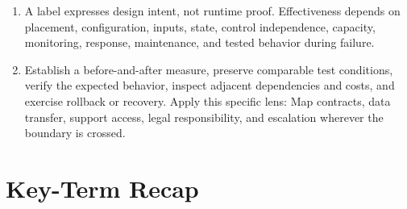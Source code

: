 \documentclass[11pt]{article}
\begin{document}
\begin{enumerate}
\item A label expresses design intent, not runtime proof. Effectiveness depends on placement, configuration, inputs, state, control independence, capacity, monitoring, response, maintenance, and tested behavior during failure.
\item Establish a before-and-after measure, preserve comparable test conditions, verify the expected behavior, inspect adjacent dependencies and costs, and exercise rollback or recovery. Apply this specific lens: Map contracts, data transfer, support access, legal responsibility, and escalation wherever the boundary is crossed.
\end{enumerate}
\section{Key-Term Recap}
\end{document}
